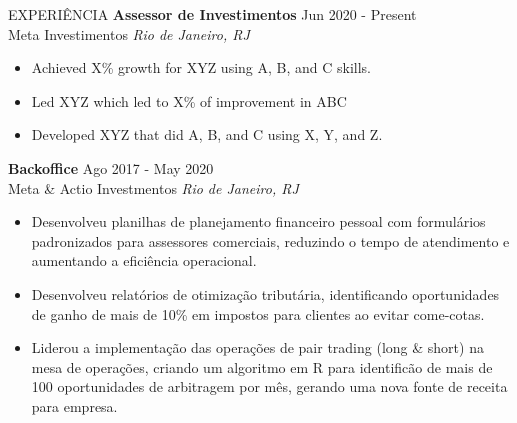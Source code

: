 \documentclass{resume} %
\begin{document}
\vspace{-1.25em}
\begin{rSection}{EXPERIÊNCIA}
\textbf{Assessor de Investimentos} \hfill Jun 2020 - Present\\
Meta Investimentos \hfill \textit{Rio de Janeiro, RJ}
{\small
\begin{itemize}
    \itemsep -5pt {} 
     \item Achieved X\% growth for XYZ using A, B, and C skills.
     \item Led XYZ which led to X\% of improvement in ABC
    \item Developed XYZ that did A, B, and C using X, Y, and Z. 
 \end{itemize}
}
\textbf{Backoffice} \hfill Ago 2017 - May 2020\\
Meta \& Actio Investmentos \hfill \textit{Rio de Janeiro, RJ}
{\small
\begin{itemize}
    \itemsep -5pt {} 
    \item Desenvolveu planilhas de planejamento financeiro pessoal com formulários padronizados para assessores comerciais, reduzindo o tempo de atendimento e aumentando a eficiência operacional.
    \item Desenvolveu relatórios de otimização tributária, identificando oportunidades de ganho de mais de 10\% em impostos para clientes ao evitar come-cotas.
    \item Liderou a implementação das operações de pair trading (long \& short) na mesa de operações, criando um algoritmo em R para identificão de mais de 100 oportunidades de arbitragem por mês, gerando uma nova fonte de receita para empresa.
\end{itemize}
}
\end{rSection} 
\end{document}
